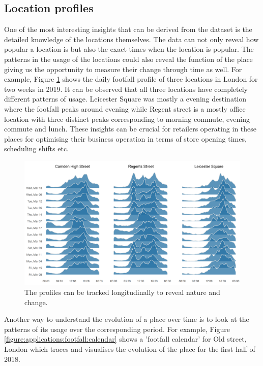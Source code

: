 \subsection{Location profiles}
One of the most interesting insights that can be derived from the dataset is the detailed knowledge of the locations themselves.
The data can not only reveal how popular a location is but also the exact times when the location is popular.
The patterns in the usage of the locations could also reveal the function of the place giving us the opportunity to measure their change through time as well.
For example, Figure \ref{figure:applications:location:profiles} shows the daily footfall profile of three locations in London for two weeks in 2019.
It can be observed that all three locations have completely different patterns of usage.
Leicester Square was mostly a evening destination where the footfall peaks around evening while Regent street is a mostly office location with three distinct peaks corresponding to morning commute, evening commute and lunch.
These insights can be crucial for retailers operating in these places for optimising their business operation in terms of store opening times, scheduling shifts etc.

\begin{figure}
  \includegraphics[trim={0 10 0 0},clip]{images/applications-location-profiles.png}
  \caption{The profiles can be tracked longitudinally to reveal nature and change.}
  \label{figure:applications:location:profiles}
\end{figure}

Another way to understand the evolution of a place over time is to look at the patterns of its usage over the corresponding period.
For example, Figure \ref{figure:applications:footfall:calendar} shows a 'footfall calendar' for Old street, London which traces and visualises the evolution of the place for the first half of 2018.

